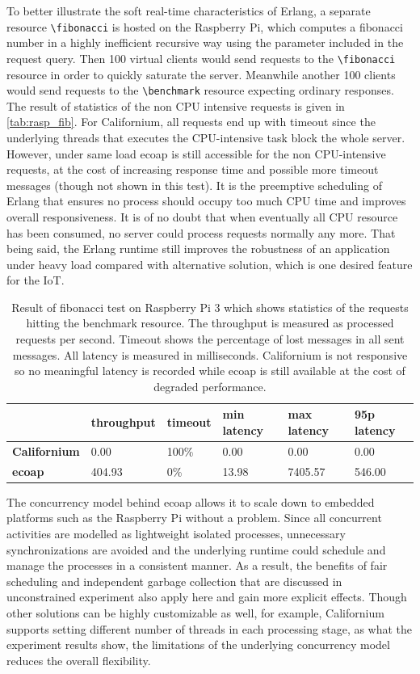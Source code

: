 To better illustrate the soft real-time characteristics of Erlang, a separate resource \verb|\fibonacci| is hosted on the Raspberry Pi, which computes a fibonacci number in a highly inefficient recursive way using the parameter included in the request query. Then 100 virtual clients would send requests to the \verb|\fibonacci| resource in order to quickly saturate the server. Meanwhile another 100 clients would send requests to the \verb|\benchmark| resource expecting ordinary responses. The result of statistics of the non CPU intensive requests is given in \autoref{tab:rasp_fib}. For Californium, all requests end up with timeout since the underlying threads that executes the CPU-intensive task block the whole server. However, under same load ecoap is still accessible for the non CPU-intensive requests, at the cost of increasing response time and possible more timeout messages (though not shown in this test). It is the preemptive scheduling of Erlang that ensures no process should occupy too much CPU time and improves overall responsiveness. It is of no doubt that when eventually all CPU resource has been consumed, no server could process requests normally any more. That being said, the Erlang runtime still improves the robustness of an application under heavy load compared with alternative solution, which is one desired feature for the IoT.

\begin{table}[!htbp]
\centering
\begin{tabular}{llllll}
%
 & \bfseries throughput &  \bfseries timeout & \bfseries min latency & \bfseries max latency & \bfseries 95p latency \\\hline
\bfseries Californium & 0.00 & 100\% & 0.00 & 0.00 & 0.00 \\\hline
\bfseries ecoap & 404.93 & 0\% & 13.98 & 7405.57 & 546.00\\
\end{tabular}
\caption[Result of fibonacci test on Raspberry Pi 3]{Result of fibonacci test on Raspberry Pi 3 which shows statistics of the requests hitting the benchmark resource. The throughput is measured as processed requests per second. Timeout shows the percentage of lost messages in all sent messages. All latency is measured in milliseconds. Californium is not responsive so no meaningful latency is recorded while ecoap is still available at the cost of degraded performance.}
\label{tab:rasp_fib}
\end{table}

The concurrency model behind ecoap allows it to scale down to embedded platforms such as the Raspberry Pi without a problem. Since all concurrent activities are modelled as lightweight isolated processes, unnecessary synchronizations are avoided and the underlying runtime could schedule and manage the processes in a consistent manner. As a result, the benefits of fair scheduling and independent garbage collection that are discussed in unconstrained experiment also apply here and gain more explicit effects. Though other solutions can be highly customizable as well, for example, Californium supports setting different number of threads in each processing stage, as what the experiment results show, the limitations of the underlying concurrency model reduces the overall flexibility. 

